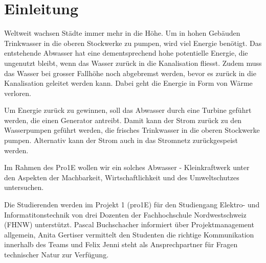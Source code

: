 \section{Einleitung}

Weltweit wachsen Städte immer mehr in die Höhe. Um in hohen Gebäuden Trinkwasser in die oberen Stockwerke zu pumpen, wird viel Energie benötigt. Das entstehende Abwasser hat eine dementsprechend hohe potentielle Energie, die ungenutzt bleibt, wenn das Wasser zurück in die Kanalisation fliesst. Zudem muss das Wasser bei grosser Fallhöhe noch abgebremst werden, bevor es zurück in die Kanalisation geleitet werden kann. Dabei geht die Energie in Form von Wärme verloren. 

Um Energie zurück zu gewinnen, soll das Abwasser durch eine Turbine geführt werden, die einen Generator antreibt. Damit kann der Strom zurück zu den Wasserpumpen geführt werden, die frisches Trinkwasser in die oberen Stockwerke pumpen. Alternativ kann der Strom auch in das Stromnetz zurückgespeist werden. 

Im Rahmen des Pro1E wollen wir ein solches Abwasser - Kleinkraftwerk unter den Aspekten der Machbarkeit, Wirtschaftlichkeit und des Umweltschutzes untersuchen.  

Die Studierenden werden im Projekt 1 (pro1E) für den Studiengang Elektro- und Informatitonstechnik von drei Dozenten der Fachhochschule Nordwestschweiz (FHNW) unterstützt. Pascal Buchschacher informiert über Projektmanagement allgemein, Anita Gertiser vermittelt den Studenten die richtige Kommunikation innerhalb des Teams und Felix Jenni steht als Ansprechpartner für Fragen technischer Natur zur Verfügung.





